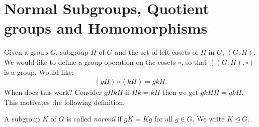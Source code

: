 \hypertarget{normal-subgroups-quotient-groups-and-homomorphisms}{%
\section{Normal Subgroups, Quotient groups and Homomorphisms}\label{normal-subgroups-quotient-groups-and-homomorphisms}}

Given a group \(G\), subgroup \(H\) of \(G\) and the set of left cosets of \(H\) in \(G\), \((G : H)\).
We would like to define a group operation on the cosets \(\circ\), so that \(((G : H), \circ)\) is a group.
Would like:
\begin{align*}
    (gH) \circ (k H) = gkH.
\end{align*}
When does this work?
Consider \(gH kH\) if \(Hk = kH\) then we get \(gkHH = gkH\).\\
This motivates the following definition.

\begin{definition}
A subgroup \(K\) of \(G\) is called \emph{normal} if \(gK = Kg\) for all \(g \in G\).
We write \(K \trianglelefteq G\).
\end{definition}

